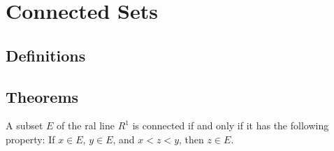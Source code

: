 \section{Connected Sets}
\subsection{Definitions}

\subsection{Theorems}
\begin{thm}
	A subset $E$ of the ral line $R^1$ is connected if and only if it has the following property: If $x \in E$, $y \in E$, and $x < z < y$, then $z \in E$.
\end{thm} 